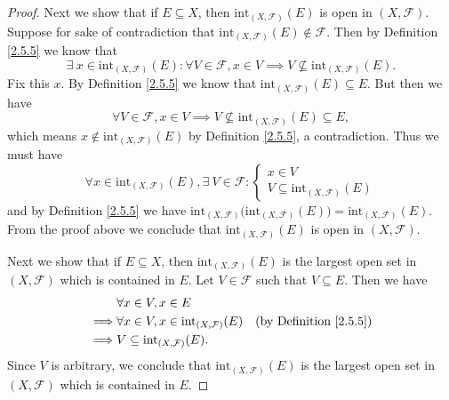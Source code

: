 \begin{proof}
    Next we show that if \(E \subseteq X\), then \(\text{int}_{(X, \mathcal{F})}(E)\) is open in \((X, \mathcal{F})\).
    Suppose for sake of contradiction that \(\text{int}_{(X, \mathcal{F})}(E) \notin \mathcal{F}\).
    Then by Definition \ref{2.5.5} we know that
    \[
        \exists\ x \in \text{int}_{(X, \mathcal{F})}(E) : \forall V \in \mathcal{F}, x \in V \implies V \not\subseteq \text{int}_{(X, \mathcal{F})}(E).
    \]
    Fix this \(x\).
    By Definition \ref{2.5.5} we know that \(\text{int}_{(X, \mathcal{F})}(E) \subseteq E\).
    But then we have
    \[
        \forall V \in \mathcal{F}, x \in V \implies V \not\subseteq \text{int}_{(X, \mathcal{F})}(E) \subseteq E,
    \]
    which means \(x \notin \text{int}_{(X, \mathcal{F})}(E)\) by Definition \ref{2.5.5}, a contradiction.
    Thus we must have
    \[
        \forall x \in \text{int}_{(X, \mathcal{F})}(E), \exists\ V \in \mathcal{F} : \begin{cases}
            x \in V \\
            V \subseteq \text{int}_{(X, \mathcal{F})}(E)
        \end{cases}
    \]
    and by Definition \ref{2.5.5} we have \(\text{int}_{(X, \mathcal{F})}\big(\text{int}_{(X, \mathcal{F})}(E)\big) = \text{int}_{(X, \mathcal{F})}(E)\).
    From the proof above we conclude that \(\text{int}_{(X, \mathcal{F})}(E)\) is open in \((X, \mathcal{F})\).

    Next we show that if \(E \subseteq X\), then \(\text{int}_{(X, \mathcal{F})}(E)\) is the largest open set in \((X, \mathcal{F})\) which is contained in \(E\).
    Let \(V \in \mathcal{F}\) such that \(V \subseteq E\).
    Then we have
    \begin{align*}
                 & \forall x \in V, x \in E                                                                     \\
        \implies & \forall x \in V, x \in \text{int}_{(X, \mathcal{F})}(E) & \text{(by Definition \ref{2.5.5})} \\
        \implies & V \subseteq \text{int}_{(X, \mathcal{F})}(E).
    \end{align*}
    Since \(V\) is arbitrary, we conclude that \(\text{int}_{(X, \mathcal{F})}(E)\) is the largest open set in \((X, \mathcal{F})\) which is contained in \(E\).


\end{proof}
